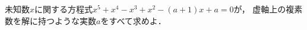 \documentclass[../../main.tex]{subfiles}
\begin{document}
未知数$x$に関する方程式$x^5+x^4-x^3+x^2-(a+1)x+a=0$が，
虚軸上の複素数を解に持つような実数$a$をすべて求めよ．
\end{document}
